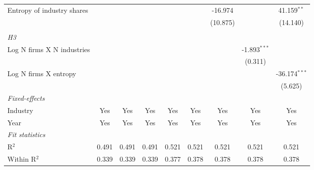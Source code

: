 \begin{tabular}{lcccccccc}
   Entropy of industry shares                            &                 &                 &                 &                  &                  & -16.974          &                  & 41.159$^{**}$\\   
                                                         &                 &                 &                 &                  &                  & (10.875)         &                  & (14.140)\\   
\hdashline %
\\[0.1ex] %
\emph{H3} \\ 
   Log N firms X N industries                            &                 &                 &                 &                  &                  &                  & -1.893$^{***}$   &   \\   
                                                         &                 &                 &                 &                  &                  &                  & (0.311)          &   \\   
   Log N firms X entropy                                 &                 &                 &                 &                  &                  &                  &                  & -36.174$^{***}$\\   
                                                         &                 &                 &                 &                  &                  &                  &                  & (5.625)\\   
   \midrule
   \emph{Fixed-effects}\\
   Industry                                              & Yes             & Yes             & Yes             & Yes              & Yes              & Yes              & Yes              & Yes\\  
   Year                                                  & Yes             & Yes             & Yes             & Yes              & Yes              & Yes              & Yes              & Yes\\  
   \midrule
   \emph{Fit statistics}\\
   R$^2$                                                 & 0.491           & 0.491           & 0.491           & 0.521            & 0.521            & 0.521            & 0.521            & 0.521\\  
   Within R$^2$                                          & 0.339           & 0.339           & 0.339           & 0.377            & 0.378            & 0.378            & 0.378            & 0.378\\  

\end{tabular}
